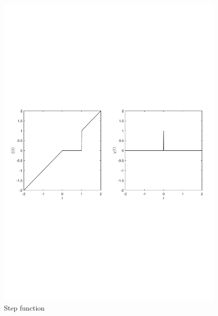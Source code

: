 \documentclass[12pt,a4]{article}
\begin{document}
\begin{figure}[h]
\centering
\includegraphics[scale=0.75]{figures/fig9.pdf}
\caption{ Step function \label{fig:stepfunction}}
\end{figure}
\end{document}
